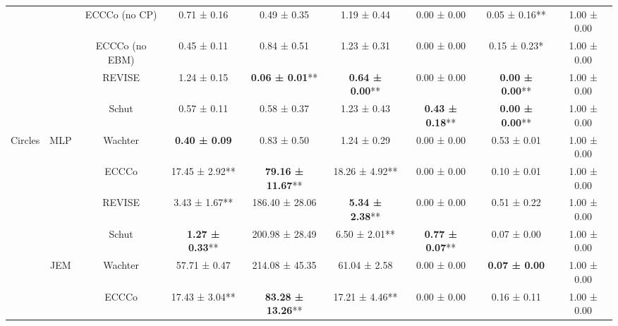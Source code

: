 \begin{table}
{\begin{tabular}[t]{ccccccccc}
 &  & ECCCo (no CP) & 0.71 ± 0.16\hphantom{*}\hphantom{*} & 0.49 ± 0.35\hphantom{*}\hphantom{*} & 1.19 ± 0.44\hphantom{*}\hphantom{*} & 0.00 ± 0.00\hphantom{*}\hphantom{*} & 0.05 ± 0.16** & 1.00 ± 0.00\hphantom{*}\hphantom{*}\\

 &  & ECCCo (no EBM) & 0.45 ± 0.11\hphantom{*}\hphantom{*} & 0.84 ± 0.51\hphantom{*}\hphantom{*} & 1.23 ± 0.31\hphantom{*}\hphantom{*} & 0.00 ± 0.00\hphantom{*}\hphantom{*} & 0.15 ± 0.23*\hphantom{*} & 1.00 ± 0.00\hphantom{*}\hphantom{*}\\

 &  & REVISE & 1.24 ± 0.15\hphantom{*}\hphantom{*} & \textbf{0.06 ± 0.01}** & \textbf{0.64 ± 0.00}** & 0.00 ± 0.00\hphantom{*}\hphantom{*} & \textbf{0.00 ± 0.00}** & 1.00 ± 0.00\hphantom{*}\hphantom{*}\\

 &  & Schut & 0.57 ± 0.11\hphantom{*}\hphantom{*} & 0.58 ± 0.37\hphantom{*}\hphantom{*} & 1.23 ± 0.43\hphantom{*}\hphantom{*} & \textbf{0.43 ± 0.18}** & \textbf{0.00 ± 0.00}** & 1.00 ± 0.00\hphantom{*}\hphantom{*}\\

\multirow[t]{-12}{*}{\centering\arraybackslash Circles} & \multirow[t]{-6}{*}{\centering\arraybackslash MLP} & Wachter & \textbf{0.40 ± 0.09}\hphantom{*}\hphantom{*} & 0.83 ± 0.50\hphantom{*}\hphantom{*} & 1.24 ± 0.29\hphantom{*}\hphantom{*} & 0.00 ± 0.00\hphantom{*}\hphantom{*} & 0.53 ± 0.01\hphantom{*}\hphantom{*} & 1.00 ± 0.00\hphantom{*}\hphantom{*}\\
\cmidrule{1-9}
 &  & ECCCo & 17.45 ± 2.92** & \textbf{79.16 ± 11.67}** & 18.26 ± 4.92** & 0.00 ± 0.00\hphantom{*}\hphantom{*} & 0.10 ± 0.01\hphantom{*}\hphantom{*} & 1.00 ± 0.00\hphantom{*}\hphantom{*}\\

 &  & REVISE & 3.43 ± 1.67** & 186.40 ± 28.06\hphantom{*}\hphantom{*} & \textbf{5.34 ± 2.38}** & 0.00 ± 0.00\hphantom{*}\hphantom{*} & 0.51 ± 0.22\hphantom{*}\hphantom{*} & 1.00 ± 0.00\hphantom{*}\hphantom{*}\\

 &  & Schut & \textbf{1.27 ± 0.33}** & 200.98 ± 28.49\hphantom{*}\hphantom{*} & 6.50 ± 2.01** & \textbf{0.77 ± 0.07}** & 0.07 ± 0.00\hphantom{*}\hphantom{*} & 1.00 ± 0.00\hphantom{*}\hphantom{*}\\

 & \multirow[t]{-4}{*}{\centering\arraybackslash JEM} & Wachter & 57.71 ± 0.47\hphantom{*}\hphantom{*} & 214.08 ± 45.35\hphantom{*}\hphantom{*} & 61.04 ± 2.58\hphantom{*}\hphantom{*} & 0.00 ± 0.00\hphantom{*}\hphantom{*} & \textbf{0.07 ± 0.00}\hphantom{*}\hphantom{*} & 1.00 ± 0.00\hphantom{*}\hphantom{*}\\
\cmidrule{2-9}
 &  & ECCCo & 17.43 ± 3.04** & \textbf{83.28 ± 13.26}** & 17.21 ± 4.46** & 0.00 ± 0.00\hphantom{*}\hphantom{*} & 0.16 ± 0.11\hphantom{*}\hphantom{*} & 1.00 ± 0.00\hphantom{*}\hphantom{*}\\


\end{tabular}}
\end{table}
